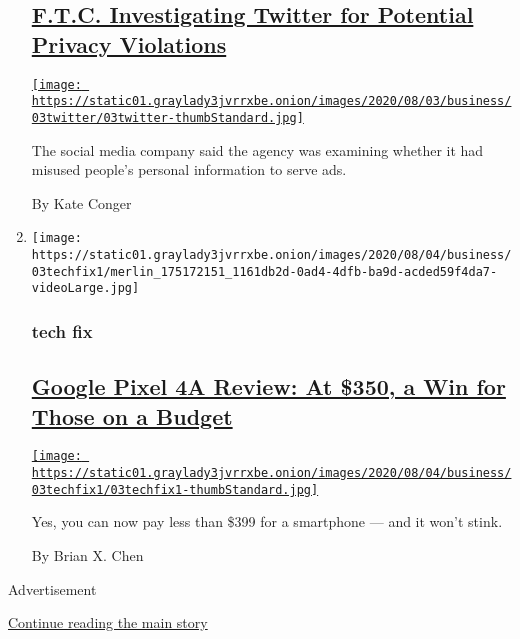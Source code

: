 \begin{enumerate}
{  \subsection{\texorpdfstring{\href{/2020/08/03/technology/ftc-twitter-privacy-violations.html}{F.T.C.
  Investigating Twitter for Potential Privacy
  Violations}}{F.T.C. Investigating Twitter for Potential Privacy Violations}}\label{ftc-investigating-twitter-for-potential-privacy-violations}}

  \href{/2020/08/03/technology/ftc-twitter-privacy-violations.html}{\texttt{[image: https://static01.graylady3jvrrxbe.onion/images/2020/08/03/business/03twitter/03twitter-thumbStandard.jpg]}}

  The social media company said the agency was examining whether it had
  misused people's personal information to serve ads.

  By Kate Conger
\item
  \texttt{[image: https://static01.graylady3jvrrxbe.onion/images/2020/08/04/business/03techfix1/merlin\_175172151\_1161db2d-0ad4-4dfb-ba9d-acded59f4da7-videoLarge.jpg]}

  \hypertarget{tech-fix}{%
  \subsubsection{tech fix}\label{tech-fix}}

  \hypertarget{google-pixel-4a-review-at-350-a-win-for-those-on-a-budget}{%
  \subsection{\texorpdfstring{\href{/2020/08/03/technology/personaltech/google-pixel-4a-review.html}{Google
  Pixel 4A Review: At \$350, a Win for Those on a
  Budget}}{Google Pixel 4A Review: At \$350, a Win for Those on a Budget}}\label{google-pixel-4a-review-at-350-a-win-for-those-on-a-budget}}

  \href{/2020/08/03/technology/personaltech/google-pixel-4a-review.html}{\texttt{[image: https://static01.graylady3jvrrxbe.onion/images/2020/08/04/business/03techfix1/03techfix1-thumbStandard.jpg]}}

  Yes, you can now pay less than \$399 for a smartphone --- and it won't
  stink.

  By Brian X. Chen
\end{enumerate}

Advertisement

\protect\hyperlink{after-mid1}{Continue reading the main story}

